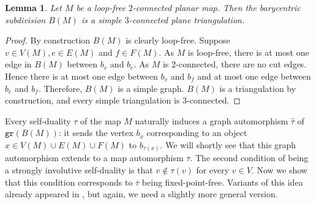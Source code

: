 \documentclass{article}
\newtheorem{lemma}[theorem]{Lemma}
\newcommand{\gr}{\mathtt{gr}}
\begin{document}
\begin{lemma}\label{lem:barycentric3conn}
Let $M$ be a loop-free $2$-connected planar map. Then the barycentric subdivision $B(M)$ is a simple $3$-connected plane triangulation.
\end{lemma}
\begin{proof}
    By construction $B(M)$ is clearly loop-free. Suppose $v\in V(M),e\in E(M)$ and $f\in F(M)$. As $M$ is loop-free, there is at most one edge in $B(M)$ between $b_v$ and $b_e$. As $M$ is 2-connected, there are no cut edges. Hence there is at most one edge between $b_v$ and $b_f$ and at most one edge between $b_e$ and $b_f$. Therefore, $B(M)$ is a simple graph. $B(M)$ is a triangulation by construction, and every simple triangulation is 3-connected.
       
\end{proof}

Every self-duality $\tau$ of the map $M$ naturally induces a graph automorphism $\widehat{\tau}$ of $\gr(B(M))$: it sends the vertex $b_x$ corresponding to an object $x\in V(M)\cup E(M)\cup F(M)$ to $b_{\tau(x)}$. We will shortly see that this graph automorphism extends to a map automorphism $\overline{\tau}$. The second condition of being a strongly involutive self-duality is that $v\notin \tau(v)$ for every $v\in V$. Now we show that this condition corresponds to $\overline{\tau}$ being fixed-point-free. Variants of this idea already appeared in \cite{kupitz2010ball,bracho2020strongly,montejano2022self}, but again, we need a slightly more general version.
\end{document}
